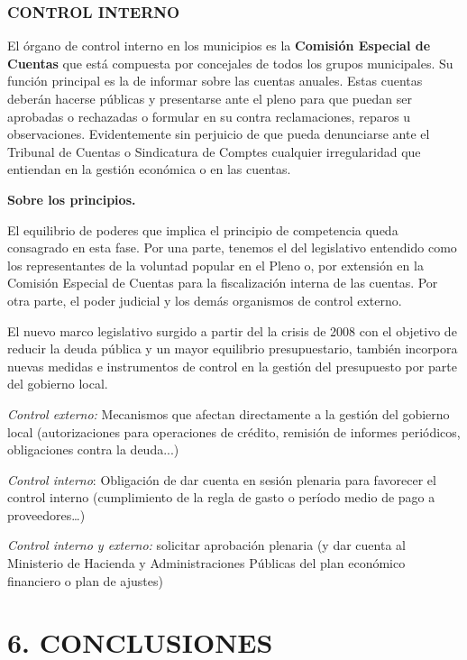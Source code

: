 \documentclass[
]{article}
\begin{document}
\hypertarget{control-interno}{%
\subsubsection{CONTROL INTERNO}\label{control-interno}}

El órgano de control interno en los municipios es la \textbf{Comisión
Especial de Cuentas} que está compuesta por concejales de todos los
grupos municipales. Su función principal es la de informar sobre las
cuentas anuales. Estas cuentas deberán hacerse públicas y presentarse
ante el pleno para que puedan ser aprobadas o rechazadas o formular en
su contra reclamaciones, reparos u observaciones. Evidentemente sin
perjuicio de que pueda denunciarse ante el Tribunal de Cuentas o
Sindicatura de Comptes cualquier irregularidad que entiendan en la
gestión económica o en las cuentas.

\textbf{Sobre los principios.}

El equilibrio de poderes que implica el principio de competencia queda
consagrado en esta fase. Por una parte, tenemos el del legislativo
entendido como los representantes de la voluntad popular en el Pleno o,
por extensión en la Comisión Especial de Cuentas para la fiscalización
interna de las cuentas. Por otra parte, el poder judicial y los demás
organismos de control externo.

El nuevo marco legislativo surgido a partir del la crisis de 2008 con el
objetivo de reducir la deuda pública y un mayor equilibrio
presupuestario, también incorpora nuevas medidas e instrumentos de
control en la gestión del presupuesto por parte del gobierno local.

\emph{Control externo:} Mecanismos que afectan directamente a la gestión
del gobierno local (autorizaciones para operaciones de crédito, remisión
de informes periódicos, obligaciones contra la deuda...)

\emph{Control interno}: Obligación de dar cuenta en sesión plenaria para
favorecer el control interno (cumplimiento de la regla de gasto o
período medio de pago a proveedores\ldots)

\emph{Control interno y externo:} solicitar aprobación plenaria (y dar
cuenta al Ministerio de Hacienda y Administraciones Públicas del plan
económico financiero o plan de ajustes)

\hypertarget{conclusiones}{%
\section{6. CONCLUSIONES}\label{conclusiones}}
\end{document}
